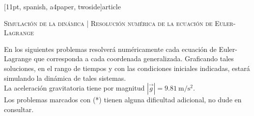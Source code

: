 [11pt, spanish, a4paper, twoside]{article}





\begin{center}
  \textsc{\large Simulación de la dinámica | Resolución numérica de la ecuación de Euler-Lagrange}
\end{center}

\noindent
En los siguientes problemas resolverá numéricamente cada ecuación de Euler-Lagrange que corresponda a cada coordenada generalizada.
Graficando tales soluciones, en el rango de tiempos y con las condiciones iniciales indicadas, estará simulando la dinámica de tales sistemas.\\
La aceleración gravitatoria tiene por magnitud \(|\vec{g}| = \SI{9.81}{\metre\per\second\squared}\).\\
Los problemas marcados con (*) tienen alguna dificultad adicional, no dude en consultar.


